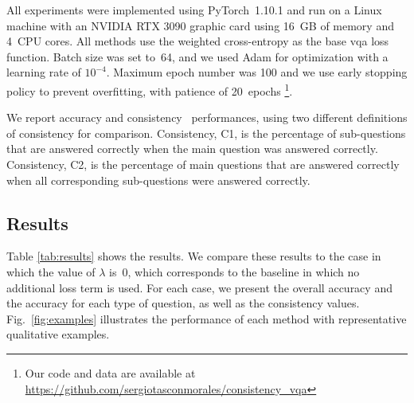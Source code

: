 All experiments were implemented using PyTorch~1.10.1 and run on a Linux machine with an NVIDIA RTX 3090 graphic card using 16~GB of memory and 4~CPU cores. All methods use the weighted cross-entropy as the base \gls{vqa} loss function. Batch size was set to~64, and we used Adam for optimization with a learning rate of $10^{-4}$. Maximum epoch number was 100 and we use early stopping policy to prevent overfitting, with patience of 20~epochs \footnote{Our code and data are available at \url{https://github.com/sergiotasconmorales/consistency_vqa}}.

We report accuracy and consistency~\cite{selvaraju2020squinting} performances, using two different definitions of consistency for comparison. Consistency, C1, is the percentage of sub-questions that are answered correctly when the main question was answered correctly. Consistency, C2, is the percentage of main questions that are answered correctly when all corresponding sub-questions were answered correctly.

\subsection{Results}
Table \ref{tab:results} shows the results.
We compare these results to the case in which the value of $\lambda$ is~0, which corresponds to the baseline in which no additional loss term is used. For each case, we present the overall accuracy and the accuracy for each type of question, as well as the consistency values. Fig.~\ref{fig:examples} illustrates the performance of each method with representative qualitative examples.


